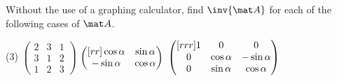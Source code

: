 \begin{problem}
    Without the use of a graphing calculator, find $\inv{\mat A}$ for each of the following cases of $\mat A$.
    \begin{tasks}(3)
        \task $\begin{pmatrix}
            2 & 3 & 1\\3 & 1 & 2\\1 & 2 & 3
        \end{pmatrix}$
        \task $\begin{pmatrix}[rr]
            \cos \alpha & \sin \alpha \\ -\sin \alpha & \cos \alpha
        \end{pmatrix}$
        \task $\begin{pmatrix}[rrr]
            1 & 0 & 0\\0 & \cos \alpha & -\sin \alpha\\0 & \sin \alpha & \cos \alpha
        \end{pmatrix}$
    \end{tasks}
\end{problem}
